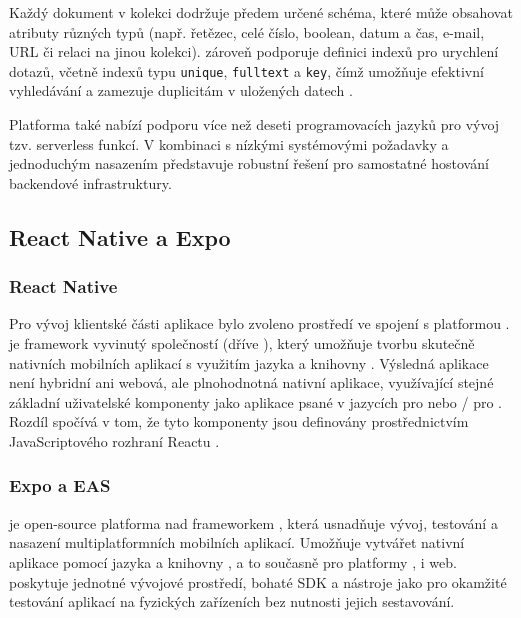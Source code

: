 \documentclass[czech, bp, kiv, he, iso690numb, pdf]{fasthesis}
\begin{document}
    Každý dokument v kolekci dodržuje předem určené schéma, které může obsahovat atributy různých typů (např. řetězec, celé číslo, boolean, datum a čas, e-mail, URL či relaci na jinou kolekci).  zároveň podporuje definici indexů pro urychlení dotazů, včetně indexů typu \texttt{unique}, \texttt{fulltext} a \texttt{key}, čímž umožňuje efektivní vyhledávání a zamezuje duplicitám v uložených datech  \cite{appwrite-collections}.

    Platforma také nabízí podporu více než deseti programovacích jazyků pro vývoj tzv. serverless funkcí. V kombinaci s nízkými systémovými požadavky a jednoduchým nasazením představuje  robustní řešení pro samostatné hostování backendové infrastruktury.



    \subsection{React Native a Expo}

    \subsubsection*{React Native}

    Pro vývoj klientské části aplikace bylo zvoleno prostředí  ve spojení s platformou .  je framework vyvinutý společností  (dříve ), který umožňuje tvorbu skutečně nativních mobilních aplikací s využitím jazyka  a knihovny . Výsledná aplikace není hybridní ani webová, ale plnohodnotná nativní aplikace, využívající stejné základní uživatelské komponenty jako aplikace psané v jazycích  pro  nebo / pro . Rozdíl spočívá v tom, že tyto komponenty jsou definovány prostřednictvím JavaScriptového rozhraní Reactu \cite{reactnative}.


    \subsubsection*{Expo a EAS}

    \textbf{} je open-source platforma nad frameworkem , která usnadňuje vývoj, testování a nasazení multiplatformních mobilních aplikací. Umožňuje vytvářet nativní aplikace pomocí jazyka  a knihovny , a to současně pro platformy ,  i web.  poskytuje jednotné vývojové prostředí, bohaté SDK a nástroje jako  pro okamžité testování aplikací na fyzických zařízeních bez nutnosti jejich sestavování.
\end{document}
